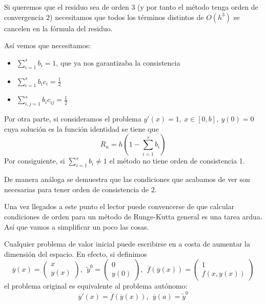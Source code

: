 Si queremos que el residuo sea de orden 3 (y por tanto el método tenga orden de convergencia $2$) necesitamos que todos los términos distintos de $O(h^3)$ se cancelen en la fórmula del residuo.

Así vemos que necesitamos:
\begin{itemize}
\item $\sum_{i=1}^sb_i = 1$, que ya nos garantizaba la consistencia
\item $\sum_{i=1}^sb_ic_i = \frac{1}{2}$
\item $\sum_{i,j=1}^sb_ic_{ij} = \frac{1}{2}$
\end{itemize}

Por otra parte, si consideramos el problema $y'(x)=1, \ x\in [0,b], \ y(0)=0$ cuya solución es la función identidad se tiene que
\[R_n=h\left( 1 - \sum_{i=1}^sb_i\right)\]
Por consiguiente, si $\sum_{i=1}^sb_i\neq 1$ el método no tiene orden de consistencia 1.

De manera análoga se demuestra que las condiciones que acabamos de ver son necesarias para tener orden de consistencia de 2.

Una vez llegados a este punto el lector puede convencerse de que calcular condiciones de orden para un método de Runge-Kutta general es una tarea ardua. Así que vamos a simplificar un poco las cosas.

Cualquier problema de valor inicial puede escribirse en  a costa de aumentar la dimensión del espacio. En efecto, si definimos
\[\overline{y}(x)=\left(\begin{array}{c} x \\ y(x)\end{array}\right), \ \ \tilde{y}^0 = \left(\begin{array}{c} 0 \\ y(0)\end{array}\right), \ \ \overline{f}(\overline{y}(x)) = \left(\begin{array}{c} 1 \\ f(x,y(x))\end{array}\right)\]
el problema original es equivalente al problema autónomo:
\[\overline{y}'(x)=\overline{f}(\overline{y}(x)), \ \ \overline{y}(a)=\tilde{y}^0\]

